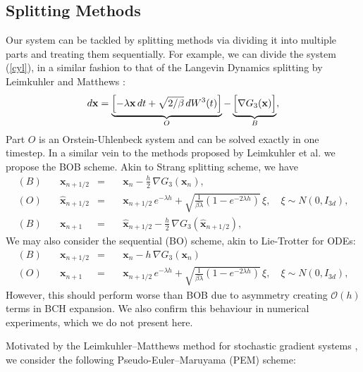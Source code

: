 \documentclass[11pt, twoside]{report}
\renewcommand{\vec}[1]{{\mathbf{#1}}}
\begin{document}
\subsection{Splitting Methods}
Our system can be tackled by splitting methods via dividing it into multiple parts and treating them sequentially. For example, we can divide the system (\ref{cyl}), in a similar fashion to that of the Langevin Dynamics splitting by Leimkuhler and Matthews \cite{leimkuhler2013rational}:
\begin{equation}  
 \begin{aligned}
 d\vec x= \underbrace{\Bigl[-\lambda \vec x \,dt +\sqrt{2/\beta}\, dW^3(t) \Bigr]}_{O} - \underbrace{\Bigl[ \nabla G_{3}(\vec x)\Bigr]}_{B},
  \end{aligned}\label{cyl_split}
\end{equation}
Part $O$ is an Orstein-Uhlenbeck system and can be solved exactly in one timestep. In a similar vein to the methods proposed by Leimkuhler et al. we propose the BOB scheme. Akin to Strang splitting scheme, we have
\begin{equation} 
\begin{aligned} 
(B) \quad &\vec x_{n+1/2}&=&\quad \vec x_{n} - \frac{h}{2}\,\nabla G_{3}(\vec x_n),\\
(O) \quad &\hat{\vec x}_{n+1/2} &=&\quad \vec x_{n+1/2}\, e^{-\lambda h} + \sqrt{\frac{1}{\beta\lambda} \left(1-e^{-2\lambda  h} \right)}\, \xi, \quad \xi \sim N(0,I_{3d}), \\
(B) \quad &\vec x_{n+1}&=&\quad \hat{\vec x}_{n+1/2} - \frac{h}{2}\,\nabla G_{3}(\hat{\vec x}_{n+1/2}),
\label{bob_split}
\end{aligned}
\end{equation}
We may also consider the sequential (BO) scheme, akin to Lie-Trotter for ODEs: 
\begin{equation} 
\begin{aligned} 
(B) \quad &\vec x_{n+1/2}&=& \quad \vec x_{n} - h\,\nabla G_{3}(\vec x_n)\\
(O) \quad &\vec x_{n+1} &=& \quad \vec x_{n+1/2}\, e^{-\lambda h} + \sqrt{\frac{1}{\beta\lambda} \left(1-e^{-2\lambda  h} \right)}\, \xi, \quad \xi \sim N(0,I_{3d}),
\label{seq_split}
\end{aligned}
\end{equation}
However, this should perform worse than BOB due to asymmetry creating $\mathcal{O}(h)$ terms in BCH expansion. We also confirm this behaviour in numerical experiments, which we do not present here.

Motivated by the Leimkuhler--Matthews method for stochastic gradient systems
\cite{LeimkuhlerMatthewsTretyakov2014}, we consider the following
Pseudo-Euler--Maruyama (PEM) scheme:
\end{document}
